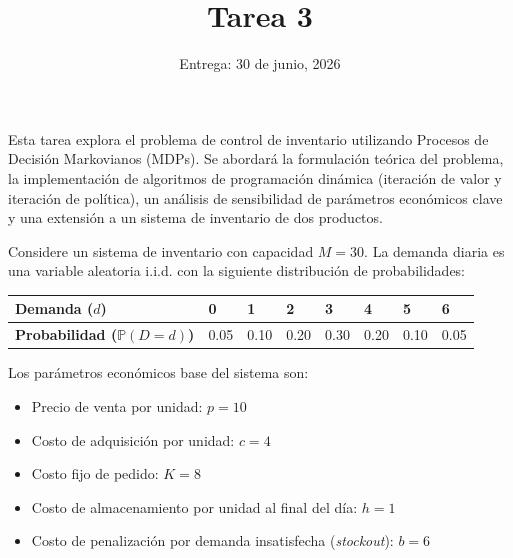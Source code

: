 \documentclass[12pt]{article}
\begin{document}
\title{Tarea 3}
\author{Entrega: 30 de junio, 2026}
\date{}
\maketitle

%

Esta tarea explora el problema de control de inventario utilizando Procesos de Decisión Markovianos (MDPs). Se abordará la formulación teórica del problema, la implementación de algoritmos de programación dinámica (iteraci\'on de valor y  iteraci\'on de pol\'itica), un análisis de sensibilidad de parámetros económicos clave y una extensión a un sistema de inventario de dos productos.

Considere un sistema de inventario con capacidad $M=30$. La demanda diaria es una variable aleatoria i.i.d. con la siguiente distribución de probabilidades:
\vspace{0.3cm}

\begin{tabularx}{\linewidth}{|l|X|X|X|X|X|X|X|}
    \hline
    \textbf{Demanda ($d$)} & 0 & 1 & 2 & 3 & 4 & 5 & 6 \\
    \hline
    \textbf{Probabilidad ($\mathbb{P}(D=d)$)} & 0.05 & 0.10 & 0.20 & 0.30 & 0.20 & 0.10 & 0.05 \\
    \hline
\end{tabularx}

\vspace{0.3cm}

Los parámetros económicos base del sistema son: 
\begin{itemize}
    \item Precio de venta por unidad: $p=10$
    \item Costo de adquisición por unidad: $c=4$
    \item Costo fijo de pedido: $K=8$
    \item Costo de almacenamiento por unidad al final del día: $h=1$
    \item Costo de penalización por demanda insatisfecha (\textit{stockout}): $b=6$
\end{itemize}
\end{document}
